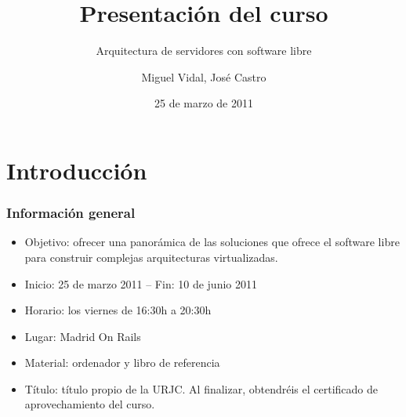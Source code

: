 \documentclass{beamer}
\begin{document}
\title{Presentación del curso}
\subtitle{Arquitectura de servidores con software libre}
\author{Miguel Vidal, José Castro}
\date{25 de marzo de 2011}



\section{Introducción}

\begin{frame}
\frametitle{Información general}
\begin{itemize}
\item \alert{Objetivo:} ofrecer una panorámica de las soluciones que ofrece el software libre para construir complejas arquitecturas virtualizadas.
\item \alert{Inicio:} 25 de marzo 2011 -- Fin: 10 de junio 2011
\item \alert{Horario:} los viernes de 16:30h a 20:30h 
\item \alert{Lugar:} Madrid On Rails
\item \alert{Material:} ordenador y libro de referencia
\item \alert{Título:} título propio de la URJC. Al finalizar, obtendréis el certificado de aprovechamiento del curso.
\end{itemize}
\end{frame}
\end{document}
